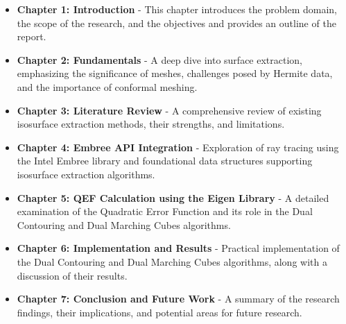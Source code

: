 \begin{itemize}
    \item \textbf{Chapter 1: Introduction} - This chapter introduces the problem domain, the scope of the research, and the objectives and provides an outline of the report.
    \item \textbf{Chapter 2: Fundamentals} - A deep dive into surface extraction, emphasizing the significance of meshes, challenges posed by Hermite data, and the importance of conformal meshing.
    \item \textbf{Chapter 3: Literature Review} - A comprehensive review of existing isosurface extraction methods, their strengths, and limitations.
    \item \textbf{Chapter 4: Embree API Integration} - Exploration of ray tracing using the Intel Embree library and foundational data structures supporting isosurface extraction algorithms.
    \item \textbf{Chapter 5: QEF Calculation using the Eigen Library} - A detailed examination of the Quadratic Error Function and its role in the Dual Contouring and Dual Marching Cubes algorithms.
    \item \textbf{Chapter 6: Implementation and Results} - Practical implementation of the Dual Contouring and Dual Marching Cubes algorithms, along with a discussion of their results.
    \item \textbf{Chapter 7: Conclusion and Future Work} - A summary of the research findings, their implications, and potential areas for future research.
\end{itemize}